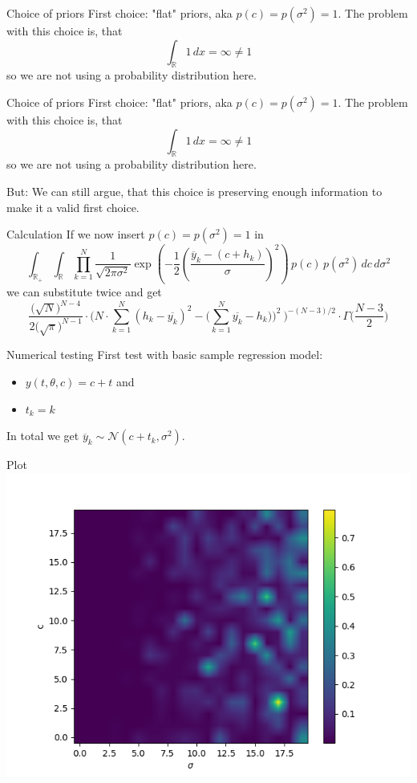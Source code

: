 \documentclass{beamer}
\newcommand{\s}{\sigma^2}
\begin{document}
	\begin{frame}{Choice of priors}
		First choice: "flat" priors, aka $p(c) = p(\s) = 1$. The problem with this
		choice is, that
		\[
			\int_\mathbb{R} 1 \, dx = \infty \neq 1
		\]
		so we are not using a probability distribution here.
	\end{frame}

	\begin{frame}{Choice of priors}
		First choice: "flat" priors, aka $p(c) = p(\s) = 1$. The problem with this
		choice is, that
		\[
			\int_\mathbb{R} 1 \, dx = \infty \neq 1
		\]
		so we are not using a probability distribution here.
	
		\vspace{1cm}
		\alert{But}: We can still argue, that this choice is preserving enough 
		information to make it a valid first choice.
	\end{frame}

	\begin{frame}{Calculation}
		If we now insert $p(c) = p(\s) = 1$ in
		\[
			\int_{\mathbb{R}_+} \int_\mathbb{R} \prod_{k = 1}^N \frac{1}{\sqrt{2 \pi \s}} \exp\left(-\frac{1}{2} 
			\left(\frac{\overline{y}_{k} -\left( c + h_{k} \right)}{\sigma}
		 	\right)^2\right) \, p(c) \, p(\s) \, dc \, d\s
		\]
		we can substitute twice and get
		\[
			\frac{\bigl(\sqrt{N}\bigr)^{N-4}}{2\bigl(\sqrt{\pi}\bigr)^{N-1}} \cdot 
			\Biggl(N \cdot \sum_{k = 1}^N (h_k - \overline{y_k})^2 - \Biggl
			(\sum_{k = 1}^N \overline{y_k} - h_k)\Biggr)^2 \ \Biggr)^{-(N-3)/2} 
			\cdot \Gamma \biggl(\frac{N-3}{2}\biggr)
		\]
	\end{frame}

	\begin{frame}{Numerical testing}
		First test with basic sample regression model:
		\begin{itemize}
			\item $y(t,\theta,c) = c + t$ and
			\item $t_k = k$
		\end{itemize}
		In total we get $\overline{y}_k \sim \mathcal{N}(c + t_k,\s)$.
	\end{frame}

	\begin{frame}{Plot}
		\includegraphics[scale=0.8]{heatmap.png}
	\end{frame}
\end{document}
